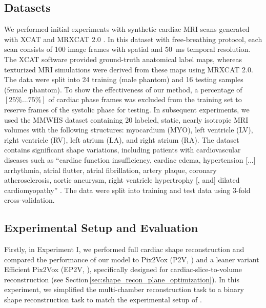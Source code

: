     \subsection{Datasets}
     We performed initial experiments with synthetic cardiac MRI scans generated with XCAT \cite{segars20104d} and MRXCAT 2.0 \cite{buoso2023mrxcat2}.
    In this dataset with free-breathing protocol, each scan consists of 100 image frames with  spatial and \SI{50}{\milli\second} temporal resolution.
    The XCAT software provided ground-truth anatomical label maps, whereas texturized MRI simulations were derived from these maps using MRXCAT 2.0.
    The data were split into 24 training (male phantom) and 16 testing samples (female phantom). To show the effectiveness of our method,
    a percentage of $\left[25\% ... 75\%\right]$ of cardiac phase frames was excluded from the training set to reserve frames of the systolic phase for testing.
    In subsequent experiments, we used the MMWHS dataset \cite{zhuang2016multi} containing 20 labeled, static, nearly isotropic MRI volumes with the following structures: myocardium (MYO), left ventricle (LV), right ventricle (RV), left atrium (LA), and right atrium (RA). The dataset contains significant shape variations, including patients with cardiovascular diseases such as ``cardiac function insufficiency, cardiac edema, hypertension [...] arrhythmia, atrial flutter, atrial fibrillation, artery plaque, coronary atherosclerosis, aortic aneurysm, right ventricle hypertrophy [, and] dilated cardiomyopathy'' \cite{zhuang2016multi}.
    The data were split into training and test data using 3-fold cross-validation.

    \subsection{Experimental Setup and Evaluation}
    \label{sec:experiments}
    Firstly, in Experiment I, we performed full cardiac shape reconstruction and compared the performance of our model to Pix2Vox (P2V, \cite{xie2019pix2vox}) and a leaner variant Efficient Pix2Vox (EP2V, \cite{stojanovski2022efficient}), specifically designed for cardiac-slice-to-volume reconstruction (see Section\,\ref{sec:shape_recon_plane_optimization}).
    In this experiment, we simplified the multi-chamber reconstruction task to a binary shape reconstruction task to match the experimental setup of \cite{stojanovski2022efficient}.

